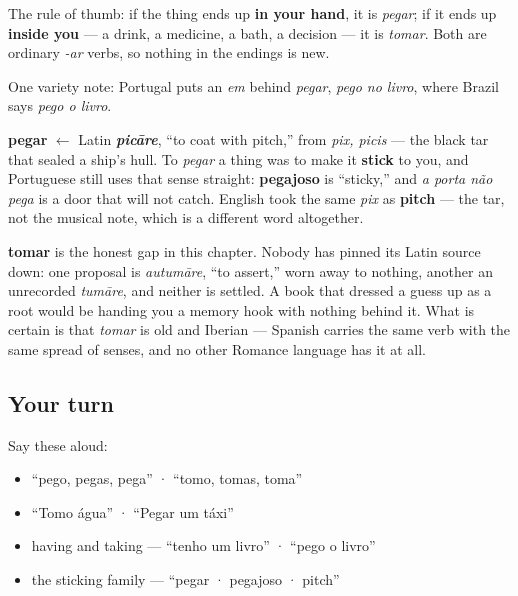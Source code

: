 The rule of thumb: if the thing ends up \textbf{in your hand}, it is \emph{pegar}; if it ends up \textbf{inside you} — a drink, a medicine, a bath, a decision — it is \emph{tomar}. Both are ordinary \emph{-ar} verbs, so nothing in the endings is new.

One variety note: Portugal puts an \emph{em} behind \emph{pegar}, \emph{pego no livro}, where Brazil says \emph{pego o livro}.

\begin{cousinweb}
\textbf{pegar} $\leftarrow$ Latin \emph{\textbf{picāre}}, \textquotedblleft{}to coat with pitch,\textquotedblright{} from \emph{pix, picis} — the black tar that sealed a ship's hull. To \emph{pegar} a thing was to make it \textbf{stick} to you, and Portuguese still uses that sense straight: \textbf{pegajoso} is \textquotedblleft{}sticky,\textquotedblright{} and \emph{a porta não pega} is a door that will not catch. English took the same \emph{pix} as \textbf{pitch} — the tar, not the musical note, which is a different word altogether.

\textbf{tomar} is the honest gap in this chapter. Nobody has pinned its Latin source down: one proposal is \emph{autumāre}, \textquotedblleft{}to assert,\textquotedblright{} worn away to nothing, another an unrecorded \emph{tumāre}, and neither is settled. A book that dressed a guess up as a root would be handing you a memory hook with nothing behind it. What is certain is that \emph{tomar} is old and Iberian — Spanish carries the same verb with the same spread of senses, and no other Romance language has it at all.
\end{cousinweb}

\subsection*{Your turn}
Say these aloud:

\begin{itemize}
\raggedright
  \item \textquotedblleft{}pego, pegas, pega\textquotedblright{} · \textquotedblleft{}tomo, tomas, toma\textquotedblright{}
  \item \textquotedblleft{}Tomo água\textquotedblright{} · \textquotedblleft{}Pegar um táxi\textquotedblright{}
  \item having and taking — \textquotedblleft{}tenho um livro\textquotedblright{} · \textquotedblleft{}pego o livro\textquotedblright{}
  \item the sticking family — \textquotedblleft{}pegar · pegajoso · pitch\textquotedblright{}
\end{itemize}


